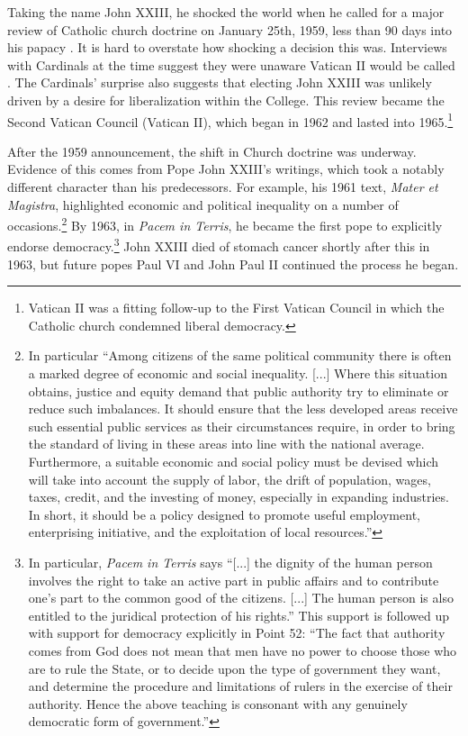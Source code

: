 \documentclass[12pt]{article}
\numberwithin{equation}{section}
\begin{document}
Taking the name John XXIII, he shocked the world when he called for a major review of Catholic church doctrine on January 25th, 1959, less than 90 days into his papacy \citep{Alberigo2005}.  It is hard to overstate how shocking a decision this was.  Interviews with Cardinals at the time suggest they were unaware Vatican II would be called \citep{Alberigo2005}. The Cardinals' surprise also suggests that electing John XXIII was unlikely driven by a desire for liberalization within the College.  This review became the Second Vatican Council (Vatican II), which began in 1962 and lasted into 1965.\footnote{Vatican II was a fitting follow-up to the First Vatican Council in which the Catholic church condemned liberal democracy.}
	
After the 1959 announcement, the shift in Church doctrine was underway. Evidence of this comes from Pope John XXIII's writings, which took a notably different character than his predecessors. For example, his 1961 text, \textit{Mater et Magistra}, highlighted economic and political inequality on a number of occasions.\footnote{In particular ``Among citizens of the same political community there is often a marked degree of economic and social inequality. {[}...{]} Where this situation obtains, justice and equity demand that public authority try to eliminate or reduce such imbalances. It should ensure that the less developed areas receive such essential public services as their circumstances require, in order to bring the standard of living in these areas into line with the national average. Furthermore, a suitable economic and social policy must be devised which will take into account the supply of labor, the drift of population, wages, taxes, credit, and the investing of money, especially in expanding industries. In short, it should be a policy designed to promote useful employment, enterprising initiative, and the exploitation of local resources.''} By 1963, in \emph{Pacem in Terris}, he became the first pope to explicitly endorse democracy.\footnote{In particular, \textit{Pacem in Terris} says ``[...] the dignity of the human person involves the right to take an active part in public affairs and to contribute one's part to the common good of the citizens. [...] The human person is also entitled to the juridical protection of his rights.'' This support is followed up with support for democracy explicitly in Point 52: ``The fact that authority comes from God does not mean that men have no power to choose those who are to rule the State, or to decide upon the type of government they want, and determine the procedure and limitations of rulers in the exercise of their authority. Hence the above teaching is consonant with any genuinely democratic form of government.''} John XXIII died of stomach cancer shortly after this in 1963, but future popes Paul VI and John Paul II continued the process he began.
\label{par:historical_context_end}
\end{document}
